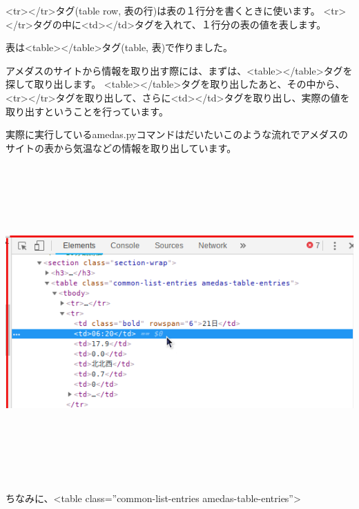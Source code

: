 \documentclass[a4paper,12pt,dvipdfmx]{jarticle}
\begin{document}
{\textless}tr{\textgreater}{\textless}/tr{\textgreater}タグ(table row,
表の行)は表の１行分を書くときに使います。
{\textless}tr{\textgreater}{\textless}/tr{\textgreater}タグの中に{\textless}td{\textgreater}{\textless}/td{\textgreater}タグを入れて、１行分の表の値を表します。


表は{\textless}table{\textgreater}{\textless}/table{\textgreater}タグ(table,
表)で作りました。


アメダスのサイトから情報を取り出す際には、まずは、{\textless}table{\textgreater}{\textless}/table{\textgreater}タグを探して取り出します。
{\textless}table{\textgreater}{\textless}/table{\textgreater}タグを取り出したあと、その中から、{\textless}tr{\textgreater}{\textless}/tr{\textgreater}タグを取り出して、さらに{\textless}td{\textgreater}{\textless}/td{\textgreater}タグを取り出し、実際の値を取り出すということを行っています。


実際に実行しているamedas.pyコマンドはだいたいこのような流れでアメダスのサイトの表から気温などの情報を取り出しています。


\bigskip


\bigskip



\begin{center}
\includegraphics[width=16.178cm,height=12.051cm]{textbook-img035-3.png}

\end{center}
ちなみに、{\textless}table class=”common-list-entries amedas-table-entries”{\textgreater}
\end{document}
